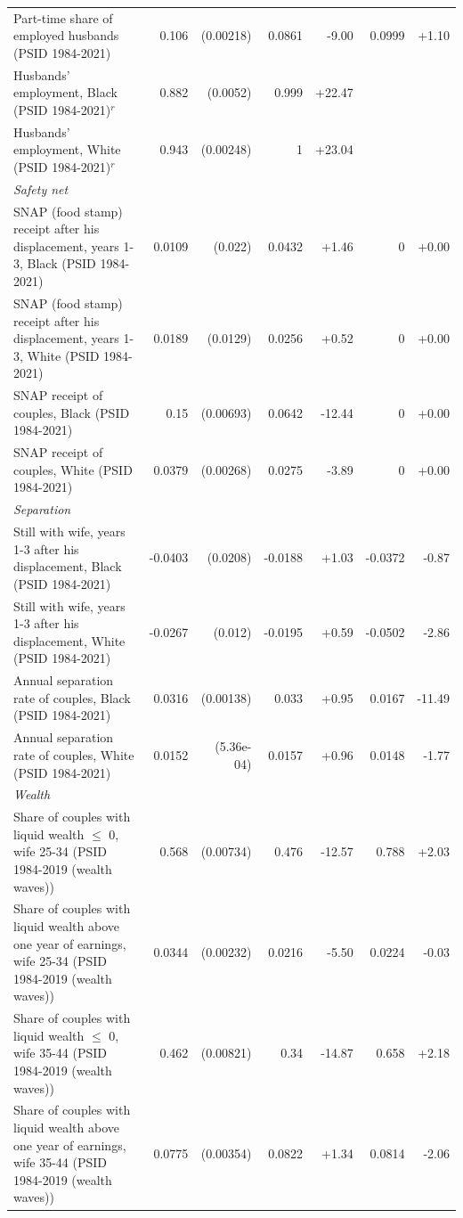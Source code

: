 {\begin{longtable}{p{6.4cm}rrrrrr}
Part-time share of employed husbands (PSID 1984-2021) & 0.106 & (0.00218) & 0.0861 & -9.00 & 0.0999 & +1.10 \\
Husbands' employment, Black (PSID 1984-2021)$^{r}$ & 0.882 & (0.0052) & 0.999 & +22.47 &  &  \\
Husbands' employment, White (PSID 1984-2021)$^{r}$ & 0.943 & (0.00248) & 1 & +23.04 &  &  \\
\multicolumn{7}{l}{\textit{Safety net}} \\
SNAP (food stamp) receipt after his displacement, years 1-3, Black (PSID 1984-2021) & 0.0109 & (0.022) & 0.0432 & +1.46 & 0 & +0.00 \\
SNAP (food stamp) receipt after his displacement, years 1-3, White (PSID 1984-2021) & 0.0189 & (0.0129) & 0.0256 & +0.52 & 0 & +0.00 \\
SNAP receipt of couples, Black (PSID 1984-2021) & 0.15 & (0.00693) & 0.0642 & -12.44 & 0 & +0.00 \\
SNAP receipt of couples, White (PSID 1984-2021) & 0.0379 & (0.00268) & 0.0275 & -3.89 & 0 & +0.00 \\
\multicolumn{7}{l}{\textit{Separation}} \\
Still with wife, years 1-3 after his displacement, Black (PSID 1984-2021) & -0.0403 & (0.0208) & -0.0188 & +1.03 & -0.0372 & -0.87 \\
Still with wife, years 1-3 after his displacement, White (PSID 1984-2021) & -0.0267 & (0.012) & -0.0195 & +0.59 & -0.0502 & -2.86 \\
Annual separation rate of couples, Black (PSID 1984-2021) & 0.0316 & (0.00138) & 0.033 & +0.95 & 0.0167 & -11.49 \\
Annual separation rate of couples, White (PSID 1984-2021) & 0.0152 & (5.36e-04) & 0.0157 & +0.96 & 0.0148 & -1.77 \\
\multicolumn{7}{l}{\textit{Wealth}} \\
Share of couples with liquid wealth $\le$ 0, wife 25-34 (PSID 1984-2019 (wealth waves)) & 0.568 & (0.00734) & 0.476 & -12.57 & 0.788 & +2.03 \\
Share of couples with liquid wealth above one year of earnings, wife 25-34 (PSID 1984-2019 (wealth waves)) & 0.0344 & (0.00232) & 0.0216 & -5.50 & 0.0224 & -0.03 \\
Share of couples with liquid wealth $\le$ 0, wife 35-44 (PSID 1984-2019 (wealth waves)) & 0.462 & (0.00821) & 0.34 & -14.87 & 0.658 & +2.18 \\
Share of couples with liquid wealth above one year of earnings, wife 35-44 (PSID 1984-2019 (wealth waves)) & 0.0775 & (0.00354) & 0.0822 & +1.34 & 0.0814 & -2.06 \\

\end{longtable}}

